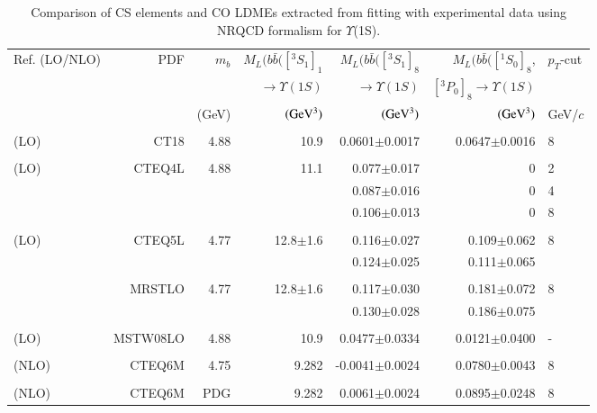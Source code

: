 \begin{table}
  \centering
  \caption{Comparison of CS elements and CO LDMEs extracted from fitting with experimental data
    using NRQCD formalism for $\Upsilon$(1S).}
  \footnotesize
  \begin{tabular*}{\textwidth}{@{\extracolsep{\fill}}lrrrrrl@{}}
    \hline
    \hline
    Ref. (LO/NLO) & PDF & $m_b$ & $M_L(b\bar{b}([^3S_1]_1$ & $M_L(b\bar{b}([^3S_1]_8$ & 
    $M_L(b\bar{b}([^1S_0]_8$, & $p_T$-cut \\
    & & & $\rightarrow\Upsilon(1S)$ & $\rightarrow\Upsilon(1S)$ & $[^3P_0]_8\rightarrow\Upsilon(1S)$ & \\
    & & (GeV) & $({\rm GeV^3})$ & $({\rm GeV^3})$ & $({\rm GeV^3})$ & GeV/$c$ \\
    \hline
    \hline
    & & & & & & \\
    \cite{Kumar:2021sek} (LO) & CT18 &4.88 &10.9 &0.0601$\pm$0.0017 & 0.0647$\pm$0.0016 & 8   \\
    & & & & & & \\
    \cite{Domenech:2000ri} (LO) & CTEQ4L & 4.88 & 11.1 & 0.077$\pm$0.017 & 0 & 2 \\
    & & & & 0.087$\pm$0.016 & 0 & 4 \\
    & & & & 0.106$\pm$0.013 & 0 & 8 \\
    & & & & & & \\
    \cite{Braaten:2000cm} (LO) & CTEQ5L & 4.77 & 12.8$\pm$1.6 & 0.116$\pm$0.027 & 0.109$\pm$0.062 & 8 \\
    & & & & 0.124$\pm$0.025 & 0.111$\pm$0.065 & \\
    & & & & & & \\
    & MRSTLO & 4.77 & 12.8$\pm$1.6 & 0.117$\pm$0.030 & 0.181$\pm$0.072 & 8 \\
    & & & & 0.130$\pm$0.028 & 0.186$\pm$0.075 & \\
    & & & & & & \\
    \cite{Sharma:2012dy} (LO) & MSTW08LO & 4.88 & 10.9 & 0.0477$\pm$0.0334 & 0.0121$\pm$0.0400 & -  \\
    & & & & & & \\
    \cite{Gong:2013qka} (NLO) & CTEQ6M & 4.75 & 9.282 & -0.0041$\pm$0.0024 & 0.0780$\pm$0.0043 & 8 \\
    & & & & & & \\
    \cite{Feng:2015wka} (NLO) & CTEQ6M & PDG & 9.282 & 0.0061$\pm$0.0024 & 0.0895$\pm$0.0248 & 8 \\
    \hline
    \hline
  \end{tabular*}
  \label{LDMEsY1S}
\end{table}

